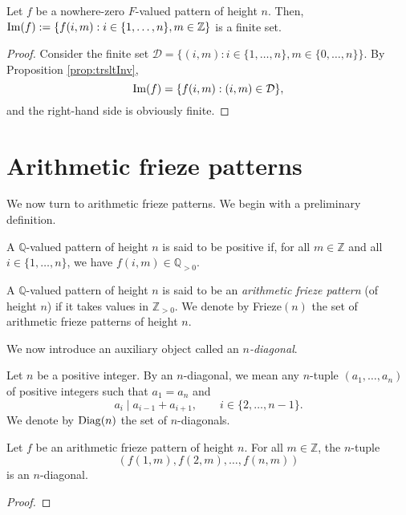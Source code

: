 \begin{corollary}
    \label{cor:imageFinite}
    Let $f$ be a nowhere-zero $F$-valued pattern of height $n$. Then, ${\rm Im}(f) := \{f (i,m) : i \in \{1,\ldots, n\}, m \in \mathbb{Z}\}$ is
    a finite set. 
\end{corollary}
\begin{proof}
    Consider the finite set $\mathcal{D} = \{(i,m) : i \in \{1,\ldots, n\}, m \in \{0,\ldots, n\}\}$. By Proposition \ref{prop:trsltInv}, 
    \[
        {\rm Im}(f) = \{f (i,m) : (i,m) \in \mathcal{D}\},
    \]
    and the right-hand side is obviously finite. 
\end{proof}


\section{Arithmetic frieze patterns}
We now turn to arithmetic frieze patterns. We begin with a preliminary definition.

\begin{definition} 
    \label{def:positivePattern}
    A $\mathbb{Q}$-valued pattern of height $n$ is said to be positive if, for all $m \in \mathbb{Z}$ and all $i \in \{1,\ldots, n\}$, we have
    $f (i,m) \in \mathbb{Q}_{>0}$. 
\end{definition}



\begin{definition}
    \label{def:arith_fp}
        A $\mathbb{Q}$-valued pattern of height $n$ is said to be an \textit{arithmetic frieze pattern} (of height $n$) if it takes values in $\mathbb{Z}_{>0}$. 
        We denote by Frieze$(n)$ the set of arithmetic frieze patterns of height $n$. 
\end{definition}

We now introduce an auxiliary object called an {\it $n$-diagonal}. 
\begin{definition}
    \label{def:nDiag}
    Let $n$ be a positive integer. By an $n$-diagonal, we mean any $n$-tuple $(a_1,\ldots, a_n)$ of positive integers 
    such that $a_1 = a_n$ and 
    \[
        a_i \mid a_{i-1} + a_{i+1}, \qquad i \in \{2, \ldots, n-1\}.
    \]
    We denote by ${\rm Diag}(n)$ the set of $n$-diagonals.
\end{definition}

\begin{proposition}
    \label{prop:friezeToDiag}
Let $f$ be an arithmetic frieze pattern of height $n$. For all $m \in \mathbb{Z}$, the $n$-tuple
\[
    (f (1,m), f (2,m), \ldots, f (n,m))
\]
is an $n$-diagonal.
\end{proposition}
\begin{proof}

\end{proof}

